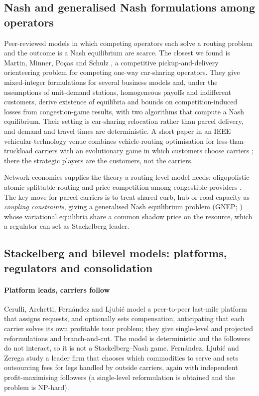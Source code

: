 \documentclass[preprint,12pt]{elsarticle}
\begin{document}
\subsection{Nash and generalised Nash formulations among operators}

Peer-reviewed models in which competing operators each solve a routing problem and the outcome is a Nash equilibrium are scarce. The closest we found is Martin, Minner, Po{\c c}as and Schulz \cite{Martin2021}, a competitive pickup-and-delivery orienteering problem for competing one-way car-sharing operators. They give mixed-integer formulations for several business models and, under the assumptions of unit-demand stations, homogeneous payoffs and indifferent customers, derive existence of equilibria and bounds on competition-induced losses from congestion-game results, with two algorithms that compute a Nash equilibrium. Their setting is car-sharing relocation rather than parcel delivery, and demand and travel times are deterministic. A short paper in an IEEE vehicular-technology venue combines vehicle-routing optimisation for less-than-truckload carriers with an evolutionary game in which customers choose carriers \cite{Kaewpuang2023}; there the strategic players are the customers, not the carriers.

Network economics supplies the theory a routing-level model needs: oligopolistic atomic splittable routing \cite{Orda1993,Cominetti2009} and price competition among congestible providers \cite{Acemoglu2007}. The key move for parcel carriers is to treat shared curb, hub or road capacity as \emph{coupling constraints}, giving a generalised Nash equilibrium problem (GNEP; \cite{Facchinei2010}) whose variational equilibria share a common shadow price on the resource, which a regulator can set as Stackelberg leader.

\subsection{Stackelberg and bilevel models: platforms, regulators and consolidation}

\paragraph{Platform leads, carriers follow} Cerulli, Archetti, Fern{\'a}ndez and Ljubi{\'c} \cite{Cerulli2024} model a peer-to-peer last-mile platform that assigns requests, and optionally sets compensation, anticipating that each carrier solves its own profitable tour problem; they give single-level and projected reformulations and branch-and-cut. The model is deterministic and the followers do not interact, so it is not a Stackelberg--Nash game. Fern{\'a}ndez, Ljubi{\'c} and Zerega \cite{Fernandez2025} study a leader firm that chooses which commodities to serve and sets outsourcing fees for legs handled by outside carriers, again with independent profit-maximising followers (a single-level reformulation is obtained and the problem is NP-hard).
\end{document}
